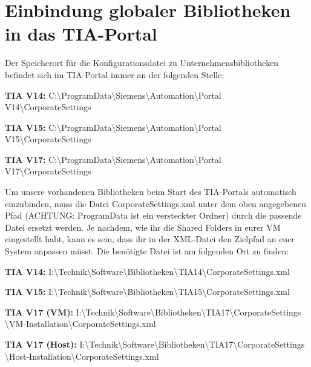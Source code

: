 \section{Einbindung globaler Bibliotheken in das TIA-Portal}\label{subsec:Einbindung globaler Bibliotheken in das TIA-Portal}
Der Speicherort für die Konfigurationsdatei zu Unternehmensbibliotheken befindet sich im TIA-Portal immer an der folgenden Stelle:\par
\noindent \textbf{TIA V14:} C:\textbackslash ProgramData\textbackslash Siemens\textbackslash Automation\textbackslash Portal V14\textbackslash CorporateSettings \par
\noindent
\noindent \textbf{TIA V15:} C:\textbackslash ProgramData\textbackslash Siemens\textbackslash Automation\textbackslash Portal V15\textbackslash CorporateSettings \par
\noindent
\noindent \textbf{TIA V17:} C:\textbackslash ProgramData\textbackslash Siemens\textbackslash Automation\textbackslash Portal V17\textbackslash CorporateSettings \par
\noindent
Um unsere vorhandenen Bibliotheken beim Start des TIA-Portals automatisch einzubinden, muss die Datei \glqq CorporateSettings.xml\grqq{} unter dem oben angegebenen Pfad (ACHTUNG: \glqq ProgramData\grqq{} ist ein versteckter Ordner) durch die passende Datei ersetzt werden. Je nachdem, wie ihr die Shared Folders in eurer VM eingestellt habt, kann es sein, dass ihr in der XML-Datei den Zielpfad an euer System anpassen müsst. Die benötigte Datei ist am folgenden Ort zu finden:\par 
\noindent \textbf{TIA V14:} I:\textbackslash Technik\textbackslash Software\textbackslash Bibliotheken\textbackslash TIA14\textbackslash CorporateSettings.xml \par
\noindent
\noindent \textbf{TIA V15:} I:\textbackslash Technik\textbackslash Software\textbackslash Bibliotheken\textbackslash TIA15\textbackslash CorporateSettings.xml \par
\noindent
\noindent \textbf{TIA V17 (VM):} I:\textbackslash Technik\textbackslash Software\textbackslash Bibliotheken\textbackslash TIA17\textbackslash CorporateSettings  \\ \textbackslash VM-Installation\textbackslash CorporateSettings.xml \par
\noindent
\noindent \textbf{TIA V17 (Host):} I:\textbackslash Technik\textbackslash Software\textbackslash Bibliotheken\textbackslash TIA17\textbackslash CorporateSettings \\ \textbackslash Host-Installation\textbackslash CorporateSettings.xml \par
\noindent


